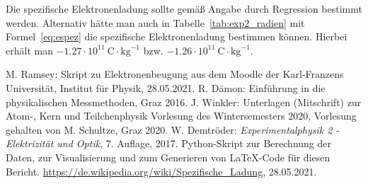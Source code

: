 \documentclass{article}
\begin{document}
Die spezifische Elektronenladung sollte gemäß Angabe durch Regression bestimmt werden. Alternativ hätte man auch in Tabelle~\ref{tab:exp2_radien} mit Formel~\eqref{eq:espez} die spezifische Elektronenladung bestimmen können. Hierbei erhält man $-1.27\cdot 10^{11}~\text{C}\cdot\text{kg}^{-1}$ bzw. $-1.26\cdot 10^{11}~\text{C}\cdot\text{kg}^{-1}$.


\begin{thebibliography}{9}
 M. Ramsey: Skript zu Elektronenbeugung aus dem Moodle der Karl-Franzens Universität, Institut für Physik, 28.05.2021.
  R. Dämon: Einführung in die physikalischen Messmethoden, Graz 2016.
  J. Winkler: Unterlagen (Mitschrift) zur Atom-, Kern und Teilchenphysik Vorlesung des Wintersemesters 2020, Vorlesung gehalten von M. Schultze, Graz 2020.
 W. Demtröder: \emph{Experimentalphysik 2 - Elektrizität  und Optik}, 7. Auflage, 2017.
 Python-Skript zur Berechnung der Daten, zur Visualisierung und zum Generieren von \LaTeX-Code für diesen Bericht.
 \url{https://de.wikipedia.org/wiki/Spezifische_Ladung}, 28.05.2021.
\end{thebibliography}


\newpage 




%

%
\end{document}
